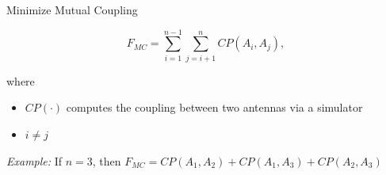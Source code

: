 \documentclass{beamer}
\begin{document}
    \begin{frame}{Minimize Mutual Coupling}
        \begin{tcolorbox}[colback=green!5]
            \begin{equation}
                F_{MC} = \sum_{i=1}^{n-1}\sum_{j=i+1}^{n} CP(A_i, A_j),
            \end{equation}
        \end{tcolorbox}
        where
        \begin{itemize}
            \item $CP(\cdot)$ computes the coupling between two antennas via a simulator
            \item $i \neq j$
        \end{itemize}
        \vspace{2mm}
        \small\textit{Example:} If $n=3$, then $F_{MC} = CP(A_1, A_2) + CP(A_1, A_3) + CP(A_2, A_3)$
    \end{frame}
\end{document}
